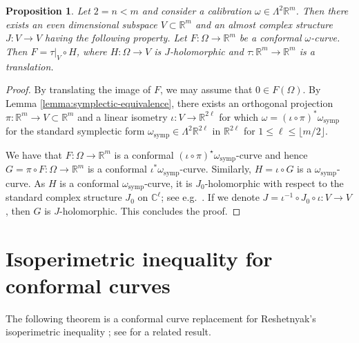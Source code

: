 \documentclass[a4paper,leqno,11pt]{amsart}
\numberwithin{equation}{section}
\newtheorem{proposition}[theorem]{Proposition}
\theoremstyle{remark}
\theoremstyle{remark}
\newcommand{\R}{\mathbb{R}}
\newcommand{\C}{\mathbb{C}}
\newcommand{\symp}{\mathrm{symp}}
\begin{document}
\begin{proposition}
\label{prop:2-dim-case}
Let $2 = n < m$ and consider a calibration $\omega \in \Lambda^2 \R^m$. Then there exists an even dimensional subspace $V\subset \R^m$ and an almost complex structure $J \colon V\to V$ having the following property. Let $F\colon \Omega \to \R^m$ be a conformal $\omega$-curve. Then $F = \tau|_V \circ H$, where $H \colon \Omega \to V$ is $J$-holomorphic and $\tau \colon \R^m \to \R^m$ is a translation. 
\end{proposition}


\begin{proof}
By translating the image of $F$, we may assume that $0 \in F(\Omega)$. By Lemma \ref{lemma:symplectic-equivalence}, there exists an orthogonal projection $\pi \colon \R^m \to V \subset \R^m$ and a linear isometry $\iota \colon V \to \mathbb{R}^{2\ell}$ for which $\omega = ( \iota \circ \pi )^{*} \omega_{\symp}$ for the standard symplectic form $\omega_\symp \in \Lambda^2 \R^{2\ell}$ in $\R^{2\ell}$ for $1 \le \ell \le \lfloor m/2 \rfloor$.

We have that $F \colon \Omega \to \R^m$ is a conformal $( \iota \circ \pi )^{\star}\omega_{\symp}$-curve and hence $G= \pi \circ F \colon \Omega \to \R^m$ is a conformal $\iota^*\omega_\symp$-curve. Similarly, $H = \iota \circ G$ is a $\omega_{\symp}$-curve. As $H$ is a conformal $\omega_{\symp}$-curve, it is $J_0$-holomorphic with respect to the standard complex structure $J_0$ on $\C^{\ell}$; see e.g.~\cite[Example 1.3]{Pan:20}. If we denote $J = \iota^{-1} \circ J_0 \circ \iota \colon V \to V$, then $G$ is $J$-holomorphic. This concludes the proof.
\end{proof}






\section{Isoperimetric inequality for conformal curves}
\label{sec:isoperimetry}

 
The following theorem is a conformal curve replacement for Reshetnyak's isoperimetric inequality \cite{Res:66:isoperi}; see \cite[Proposition 6.7]{Iko:23} for a related result.
\end{document}
